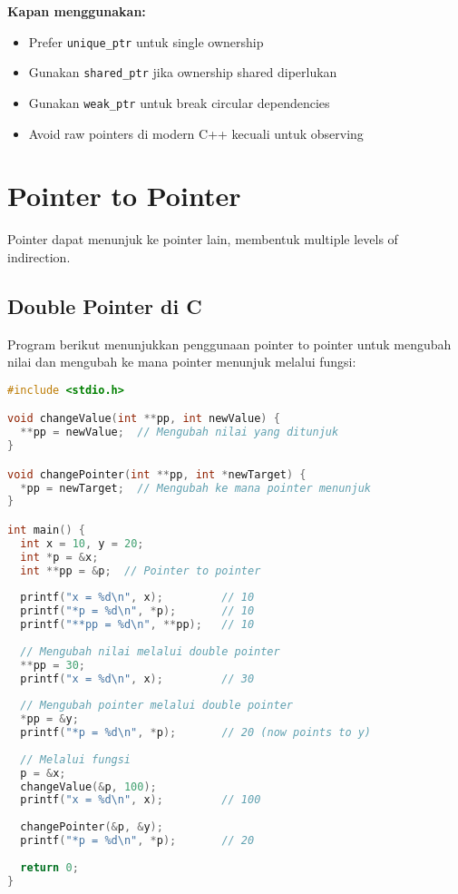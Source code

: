 \documentclass[../main.tex]{subfiles}
\begin{document}
\textbf{Kapan menggunakan:}
\begin{itemize}
  \item Prefer \texttt{unique\_ptr} untuk single ownership
  \item Gunakan \texttt{shared\_ptr} jika ownership shared diperlukan
  \item Gunakan \texttt{weak\_ptr} untuk break circular dependencies
  \item Avoid raw pointers di modern C++ kecuali untuk observing
\end{itemize}

\section{Pointer to Pointer}

Pointer dapat menunjuk ke pointer lain, membentuk multiple levels of indirection.

\subsection{Double Pointer di C}

Program berikut menunjukkan penggunaan pointer to pointer untuk mengubah nilai dan mengubah ke mana pointer menunjuk melalui fungsi:

\begin{lstlisting}[language=C, caption={Pointer to pointer di C}]
#include <stdio.h>

void changeValue(int **pp, int newValue) {
  **pp = newValue;  // Mengubah nilai yang ditunjuk
}

void changePointer(int **pp, int *newTarget) {
  *pp = newTarget;  // Mengubah ke mana pointer menunjuk
}

int main() {
  int x = 10, y = 20;
  int *p = &x;
  int **pp = &p;  // Pointer to pointer
  
  printf("x = %d\n", x);         // 10
  printf("*p = %d\n", *p);       // 10
  printf("**pp = %d\n", **pp);   // 10
  
  // Mengubah nilai melalui double pointer
  **pp = 30;
  printf("x = %d\n", x);         // 30
  
  // Mengubah pointer melalui double pointer
  *pp = &y;
  printf("*p = %d\n", *p);       // 20 (now points to y)
  
  // Melalui fungsi
  p = &x;
  changeValue(&p, 100);
  printf("x = %d\n", x);         // 100
  
  changePointer(&p, &y);
  printf("*p = %d\n", *p);       // 20
  
  return 0;
}
\end{lstlisting}
\end{document}
